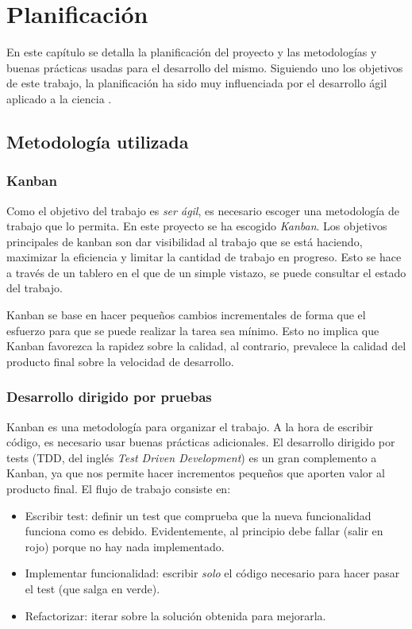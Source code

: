 \chapter{Planificación}

En este capítulo se detalla la planificación del proyecto y las metodologías y buenas prácticas
usadas para el desarrollo del mismo. Siguiendo uno los objetivos de este trabajo, la planificación
ha sido muy influenciada por el desarrollo ágil aplicado a la ciencia \cite{desarrolloagil}.

\section{Metodología utilizada}

\subsection{Kanban}

Como el objetivo del trabajo es \textit{ser ágil}, es necesario escoger una metodología de trabajo que
lo permita. En este proyecto se ha escogido \textit{Kanban}. Los objetivos principales de kanban son dar
visibilidad al trabajo que se está haciendo, maximizar la eficiencia y limitar la cantidad de trabajo
en progreso. Esto se hace a través de un tablero en el que de un simple vistazo, se puede consultar el
estado del trabajo.

Kanban se base en hacer pequeños cambios incrementales de forma que el esfuerzo para que se puede realizar
la tarea sea mínimo. Esto no implica que Kanban favorezca la rapidez sobre la calidad, al contrario,
prevalece la calidad del producto final sobre la velocidad de desarrollo.

\subsection{Desarrollo dirigido por pruebas}

Kanban es una metodología para organizar el trabajo. A la hora de escribir código, es necesario usar
buenas prácticas adicionales. El desarrollo dirigido por tests (TDD, del inglés \textit{Test Driven Development})
es un gran complemento a Kanban, ya que nos permite hacer incrementos pequeños que aporten valor al
producto final. El flujo de trabajo consiste en:

\begin{itemize}
    \item Escribir test: definir un test que comprueba que la nueva funcionalidad funciona como es debido.
          Evidentemente, al principio debe fallar (salir en rojo) porque no hay nada implementado.
    \item Implementar funcionalidad: escribir \textit{solo} el código necesario para hacer pasar el test
          (que salga en verde).
    \item Refactorizar: iterar sobre la solución obtenida para mejorarla.
\end{itemize}

